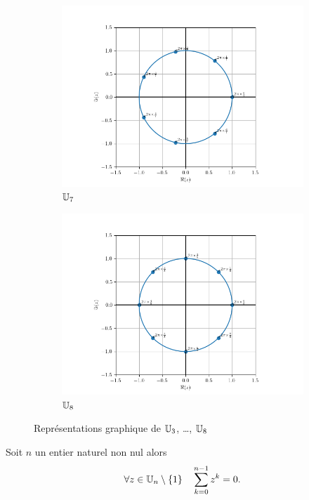 \begin{figure}
\begin{subfigure}{.3\textwidth}
    \includegraphics[scale = 0.33]{U_7.png}
    \caption{$\mathbb{U}_7$}\label{fig:U7}
  \end{subfigure}
  \begin{subfigure}{.3\textwidth}
    \centering
    \includegraphics[scale = 0.33]{U_8.png}
    \caption{$\mathbb{U}_8$}\label{fig:U8}
  \end{subfigure}
  \caption{Représentations graphique de
  \(\mathbb{U}_3\), \ldots, \(\mathbb{U}_{8}\)}\label{fig:racinesnieme}
\end{figure}

\begin{theo}
  Soit \(n\) un entier naturel non nul alors
  \begin{equation}
    \forall{}z \in{}\mathbb{U}_n \setminus\{1\} \quad \sum_{k = 0}^{n-1} z^k = 0.
  \end{equation}
\end{theo}


